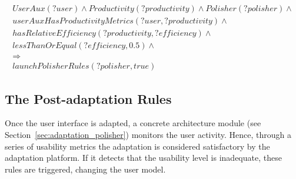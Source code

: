 \footnotesize
\begin{equation} \label{ec:usability_rule}
  \begin{align*} 
  UserAux(?user) ∧ Productivity(?productivity) ∧ Polisher(?polisher) ∧\\ 
  userAuxHasProductivityMetrics(?user, ?productivity) ∧ \\
  hasRelativeEfficiency(?productivity, ?efficiency) ∧ \\
  lessThanOrEqual(?efficiency, 0.5) ∧ \\
  \Rightarrow \\
  launchPolisherRules(?polisher, true)
  \end{align*}
\end{equation}
\normalsize

\subsection{The Post-adaptation Rules}
Once the user interface is adapted, a concrete architecture module (see 
Section~\ref{sec:adaptation_polisher}) monitors the user activity. Hence, through
a series of usability metrics the adaptation is considered satisfactory by
the adaptation platform. If it detects that the usability level is inadequate,
these rules are triggered, changing the user model.

